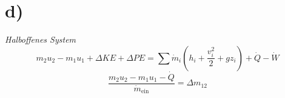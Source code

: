 

\section*{d)}
\textit{Halboffenes System}
\[
m_2 u_2 - m_1 u_1 + \Delta KE + \Delta PE = \sum \dot{m}_i \left( h_i + \frac{v_i^2}{2} + gz_i \right) + \dot{Q} - \dot{W}
\]
\[
\frac{m_2 u_2 - m_1 u_1 - \dot{Q}}{\dot{m}_{\text{ein}}} = \Delta m_{12}
\]
